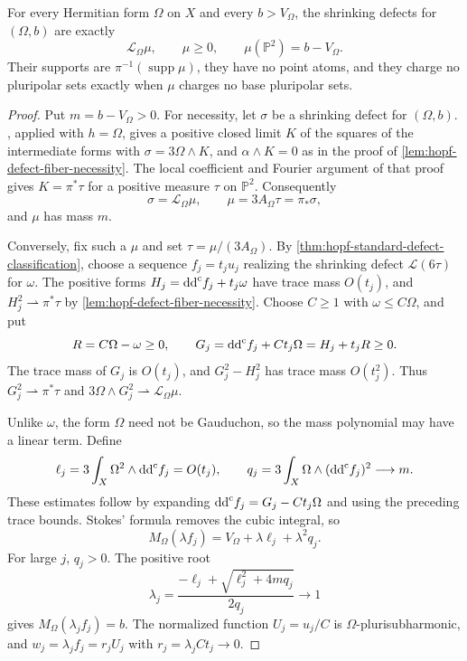 \begin{theorem}\label{thm:hopf-hermitian-defect-classification}
For every Hermitian form $\Omega$ on $X$ and every $b>V_\Omega$, the shrinking defects for $(\Omega,b)$ are exactly
\[
 \mathcal L_\Omega\mu,\qquad
 \mu\geq0,\qquad \mu(\mathbb P^2)=b-V_\Omega.
\]
Their supports are $\pi^{-1}(\operatorname{supp}\mu)$, they have no point atoms, and they charge no pluripolar sets exactly when $\mu$ charges no base pluripolar sets.
\end{theorem}
\begin{proof}
Put $m=b-V_\Omega>0$. For necessity, let $\sigma$ be a shrinking defect for $(\Omega,b)$. , applied with $h=\Omega$, gives a positive closed limit $K$ of the squares of the intermediate forms with $\sigma=3\Omega\wedge K$, and $\alpha\wedge K=0$ as in the proof of \cref{lem:hopf-defect-fiber-necessity}. The local coefficient and Fourier argument of that proof gives $K=\pi^*\tau$ for a positive measure $\tau$ on $\mathbb P^2$. Consequently
\[
 \sigma=\mathcal L_\Omega\mu,\qquad
 \mu=3A_\Omega\tau=\pi_*\sigma,
\]
and $\mu$ has mass $m$.

Conversely, fix such a $\mu$ and set $\tau=\mu/(3A_\Omega)$. By \cref{thm:hopf-standard-defect-classification}, choose a sequence $f_j=t_ju_j$ realizing the shrinking defect $\mathcal L(6\tau)$ for $\omega$. The positive forms $H_j=\mathrm{dd}^{\mathrm{c}} f_j+t_j\omega$ have trace mass $O(t_j)$, and $H_j^2\rightharpoonup\pi^*\tau$ by \cref{lem:hopf-defect-fiber-necessity}. Choose $C\geq1$ with $\omega\leq C\Omega$, and put
\[
 R=C\Omega-\omega\geq0,\qquad
 G_j=\mathrm{dd}^{\mathrm{c}} f_j+Ct_j\Omega=H_j+t_jR\geq0.
\]
The trace mass of $G_j$ is $O(t_j)$, and $G_j^2-H_j^2$ has trace mass $O(t_j^2)$. Thus $G_j^2\rightharpoonup\pi^*\tau$ and $3\Omega\wedge G_j^2\rightharpoonup\mathcal L_\Omega\mu$.

Unlike $\omega$, the form $\Omega$ need not be Gauduchon, so the mass polynomial may have a linear term. Define
\[
 \ell_j=3\int_X\Omega^2\wedge\mathrm{dd}^{\mathrm{c}} f_j=O(t_j),\qquad
 q_j=3\int_X\Omega\wedge(\mathrm{dd}^{\mathrm{c}} f_j)^2\longrightarrow m.
\]
These estimates follow by expanding $\mathrm{dd}^{\mathrm{c}} f_j=G_j-Ct_j\Omega$ and using the preceding trace bounds. Stokes' formula removes the cubic integral, so
\[
 M_\Omega(\lambda f_j)=V_\Omega+\lambda\ell_j+\lambda^2q_j.
\]
For large $j$, $q_j>0$. The positive root
\begin{equation}\label{eq:hopf-hermitian-mass-correction}
 \lambda_j=\frac{-\ell_j+\sqrt{\ell_j^2+4mq_j}}{2q_j}
 \longrightarrow1
\end{equation}
gives $M_\Omega(\lambda_jf_j)=b$. The normalized function $U_j=u_j/C$ is $\Omega$-plurisubharmonic, and $w_j=\lambda_j f_j=r_jU_j$ with $r_j=\lambda_jCt_j\to0$.


\end{proof}
